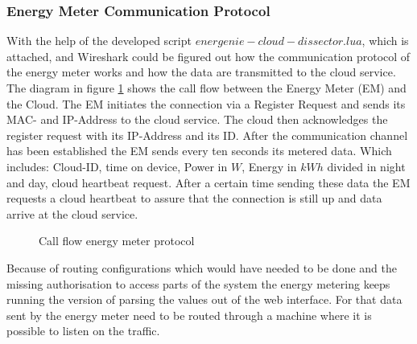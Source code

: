 \subsubsection{Energy Meter Communication Protocol}
With the help of the developed script $ energenie-cloud-dissector.lua $, which is attached, and Wireshark could be figured out how the communication protocol of the energy meter works and how the data are transmitted to the cloud service. The diagram in figure \ref{fig:energyCommunicationProtocol} shows the call flow between the Energy Meter (EM) and the Cloud. The EM initiates the connection via a Register Request and sends its MAC- and IP-Address to the cloud service. The cloud then acknowledges the register request with its IP-Address and its ID. After the communication channel has been established the EM sends every ten seconds its metered data. Which includes: Cloud-ID, time on device, Power in $ W $, Energy in $ kWh $ divided in night and day, cloud heartbeat request. After a certain time sending these data the EM requests a cloud heartbeat to assure that the connection is still up and data arrive at the cloud service.

\begin{figure}
	\centering
	\def\svgwidth{0.75\columnwidth}
	
	\caption{Call flow energy meter protocol}
	\label{fig:energyCommunicationProtocol}
\end{figure}

Because of routing configurations which would have needed to be done and the missing authorisation to access parts of the system the energy metering keeps running the version of parsing the values out of the web interface. For that data sent by the energy meter need to be routed through a machine where it is possible to listen on the traffic. 







